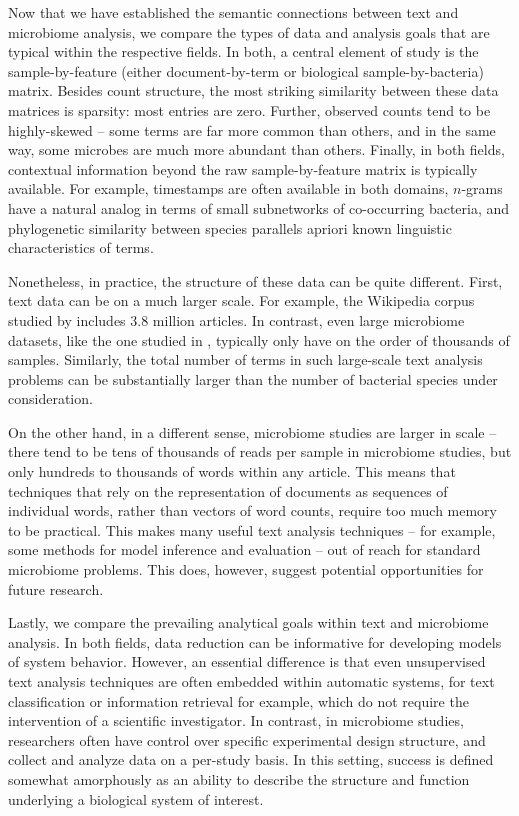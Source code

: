 \documentclass[oupdraft]{bio}
\begin{document}
Now that we have established the semantic connections between text and
microbiome analysis, we compare the types of data and analysis goals that are
typical within the respective fields. In both, a central element of study is
the sample-by-feature (either document-by-term or biological sample-by-bacteria)
matrix. Besides count structure, the most striking similarity between these data
matrices is sparsity: most entries are zero. Further, observed counts tend to be
highly-skewed -- some terms are far more common than others, and in the same
way, some microbes are much more abundant than others. Finally, in both fields,
contextual information beyond the raw sample-by-feature matrix is typically
available. For example, timestamps are often available in both domains,
$n$-grams have a natural analog in terms of small subnetworks of co-occurring
bacteria, and phylogenetic similarity between species parallels apriori known
linguistic characteristics of terms.

Nonetheless, in practice, the structure of these data can be quite different.
First, text data can be on a much larger scale. For example, the Wikipedia
corpus studied by \cite{hoffman2013stochastic} includes 3.8 million articles. In
contrast, even large microbiome datasets, like the one studied in
\citep{human2012structure}, typically only have on the order of thousands of
samples. Similarly, the total number of terms in such large-scale text analysis
problems can be substantially larger than the number of bacterial species under
consideration.

On the other hand, in a different sense, microbiome studies are larger in scale
-- there tend to be tens of thousands of reads per sample in microbiome studies,
but only hundreds to thousands of words within any article. This means that
techniques that rely on the representation of documents as sequences of
individual words, rather than vectors of word counts, require too much memory to
be practical. This makes many useful text analysis techniques -- for example,
some methods for model inference \citep{griffiths2004finding} and evaluation
\citep{wallach2009evaluation} -- out of reach for standard microbiome problems.
This does, however, suggest potential opportunities for future research.

Lastly, we compare the prevailing analytical goals within text and microbiome
analysis. In both fields, data reduction can be informative for developing
models of system behavior. However, an essential difference is that even
unsupervised text analysis techniques are often embedded within automatic
systems, for text classification \citep{blei2003latent} or information retrieval
\citep{krestel2009latent} for example, which do not require the intervention of
a scientific investigator. In contrast, in microbiome studies, researchers often
have control over specific experimental design structure, and collect and
analyze data on a per-study basis. In this setting, success is defined somewhat
amorphously as an ability to describe the structure and function underlying a
biological system of interest.
\end{document}
